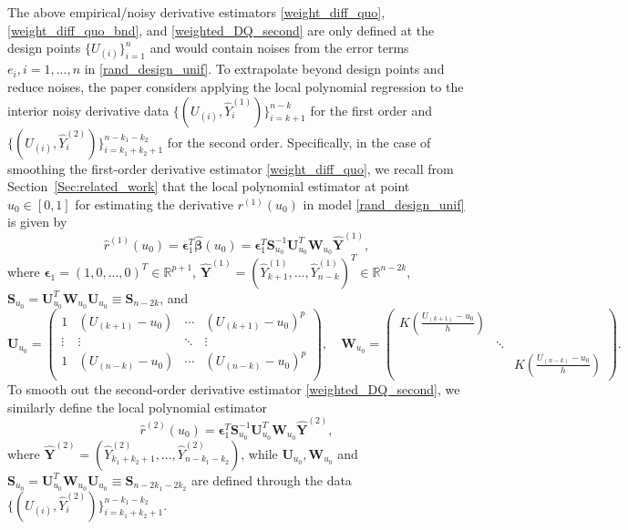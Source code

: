 \documentclass{uwstat572}
\theoremstyle{definition}
\renewcommand{\hat}{\widehat}
\theoremstyle{theorem}
\begin{document}
The above empirical/noisy derivative estimators \eqref{weight_diff_quo}, \eqref{weight_diff_quo_bnd}, and \eqref{weighted_DQ_second} are only defined at the design points $\{U_{(i)}\}_{i=1}^n$ and would contain noises from the error terms $e_i,i=1,...,n$ in \eqref{rand_design_unif}. To extrapolate beyond design points and reduce noises, the paper considers applying the local polynomial regression to the interior noisy derivative data $\{(U_{(i)}, \hat{Y}_i^{(1)})\}_{i=k+1}^{n-k}$ for the first order and $\{(U_{(i)}, \hat{Y}_i^{(2)})\}_{i=k_1+k_2+1}^{n-k_1-k_2}$ for the second order. Specifically, in the case of smoothing the first-order derivative estimator \eqref{weight_diff_quo}, we recall from Section~\ref{Sec:related_work} that the local polynomial estimator at point $u_0\in [0,1]$ for estimating the derivative $r^{(1)}(u_0)$ in model \eqref{rand_design_unif} is given by
\begin{equation}
\label{loc_poly_first}
\hat{r}^{(1)}(u_0) = \bm{\epsilon}_1^T \hat{\bm{\beta}}(u_0) = \bm{\epsilon}_1^T \bm{S}_{u_0}^{-1} \bm{U}_{u_0}^T \bm{W}_{u_0} \hat{\bm{Y}}^{(1)},
\end{equation}
where $\bm{\epsilon}_1=(1,0,...,0)^T \in \mathbb{R}^{p+1}$, $\hat{\bm{Y}}^{(1)} = \left(\hat{Y}_{k+1}^{(1)},...,\hat{Y}_{n-k}^{(1)}\right)^T \in \mathbb{R}^{n-2k}$, $\bm{S}_{u_0}=\bm{U}_{u_0}^T \bm{W}_{u_0} \bm{U}_{u_0} \equiv \bm{S}_{n-2k}$, and 
$$\bm{U}_{u_0} = \begin{pmatrix}
	1 & \left(U_{(k+1)}-u_0\right) & \cdots & \left(U_{(k+1)}-u_0\right)^p\\
	\vdots & \vdots & \ddots & \vdots\\
	1 & \left(U_{(n-k)}-u_0\right) & \cdots & \left(U_{(n-k)}-u_0\right)^p\\
\end{pmatrix}, \quad \bm{W}_{u_0} = \begin{pmatrix}
	K\left(\frac{U_{(k+1)}-u_0}{h}\right) & & \\
	& \ddots & \\
	& & K\left(\frac{U_{(n-k)}-u_0}{h}\right)
\end{pmatrix}.$$
To smooth out the second-order derivative estimator \eqref{weighted_DQ_second}, we similarly define the local polynomial estimator
\begin{equation}
\label{local_poly_second}
\hat{r}^{(2)}(u_0) = \bm{\epsilon}_1^T \bm{S}_{u_0}^{-1} \bm{U}_{u_0}^T \bm{W}_{u_0} \hat{\bm{Y}}^{(2)},
\end{equation}
where $\hat{\bm{Y}}^{(2)} = \left(\hat{Y}_{k_1+k_2+1}^{(2)},...,\hat{Y}_{n-k_1-k_2}^{(2)}\right)$, while $\bm{U}_{u_0},\bm{W}_{u_0}$ and $\bm{S}_{u_0}=\bm{U}_{u_0}^T \bm{W}_{u_0} \bm{U}_{u_0} \equiv \bm{S}_{n-2k_1-2k_2}$ are defined through the data $\{(U_{(i)}, \hat{Y}_i^{(2)})\}_{i=k_1+k_2+1}^{n-k_1-k_2}$.
\end{document}
